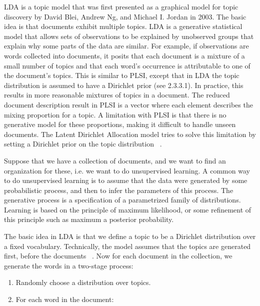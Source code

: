 \documentclass[12pt]{report}
\begin{document}
LDA is a topic model that was first presented as a graphical model for topic
discovery by David Blei, Andrew Ng, and Michael I. Jordan in 2003. The basic
idea is that documents exhibit multiple topics. LDA is a generative statistical
model that allows sets of observations to be explained by unobserved groups
that explain why some parts of the data are similar. For example, if
observations are words collected into documents, it posits that each document
is a mixture of a small number of topics and that each word's occurrence is
attributable to one of the document's topics. This is similar to PLSI, except
that in LDA the topic distribution is assumed to have a Dirichlet prior (see
2.3.3.1). In practice, this results in more reasonable mixtures of topics in a
document. The reduced document description result in PLSI is a vector where
each element describes the mixing proportion for a topic. A limitation with
PLSI is that there is no generative model for these proportions, making it
difficult to handle unseen documents. The Latent Dirichlet Allocation model
tries to solve this limitation by setting a Dirichlet prior on the topic
distribution ~\cite{blei2003latent}.
 
Suppose that we have a collection of documents, and we want to find an
organization for these, i.e. we want to do unsupervised learning. A common way
to do unsupervised learning is to assume that the data were generated by some
probabilistic process, and then to infer the parameters of this process. The
generative process is a specification of a parametrized family of
distributions. Learning is based on the principle of maximum likelihood, or
some refinement of this principle such as maximum a posterior probability.
 
The basic idea in LDA is that we define a topic to be a Dirichlet distribution
over a fixed vocabulary. Technically, the model assumes that the topics are
generated first, before the documents ~\cite{Blei11introductionto}. Now for each document in the collection,
we generate the words in a two-stage process:


\begin{enumerate}
\item Randomly choose a distribution over topics.
\item For each word in the document:
\end{enumerate}
\end{document}
